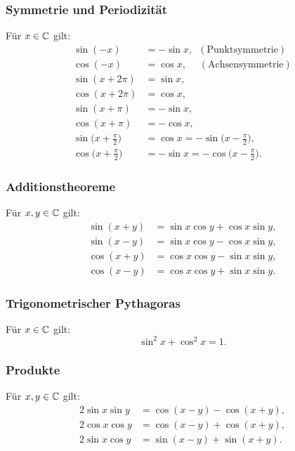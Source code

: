 \subsubsection{Symmetrie und Periodizität}
Für $x\in\mathbb C$ gilt:
\begin{align}
\sin(-x) &= -\sin x,\enspace(\text{Punktsymmetrie})\\
\cos(-x) &= \cos x,\quad\;(\text{Achsensymmetrie})\\
\sin(x+2\pi) &= \sin x,\\
\cos(x+2\pi) &= \cos x,\\
\sin(x+\pi)  &=-\sin x,\\
\cos(x+\pi)  &=-\cos x,\\
\sin\Big(x+\frac{\pi}{2}\Big) &= \cos x = -\sin\Big(x-\frac{\pi}{2}\Big),\\
\cos\Big(x+\frac{\pi}{2}\Big) &= -\sin x = -\cos\Big(x-\frac{\pi}{2}\Big).
\end{align}

\subsubsection{Additionstheoreme}

Für $x,y\in\mathbb C$ gilt:
\begin{align}
\sin(x+y) &= \sin x\cos y+\cos x\sin y,\\
\sin(x-y) &= \sin x\cos y-\cos x\sin y,\\
\cos(x+y) &= \cos x\cos y-\sin x\sin y,\\
\cos(x-y) &= \cos x\cos y+\sin x\sin y.
\end{align}

\subsubsection{Trigonometrischer Pythagoras}
Für $x\in\mathbb C$ gilt:
\begin{equation}
\sin^2 x+\cos^2 x=1.
\end{equation}

\subsubsection{Produkte}
Für $x,y\in\mathbb C$ gilt:
\begin{align}
2\sin x\sin y &= \cos(x-y)-\cos(x+y),\\
2\cos x\cos y &= \cos(x-y)+\cos(x+y),\\
2\sin x\cos y &= \sin(x-y)+\sin(x+y).
\end{align}

